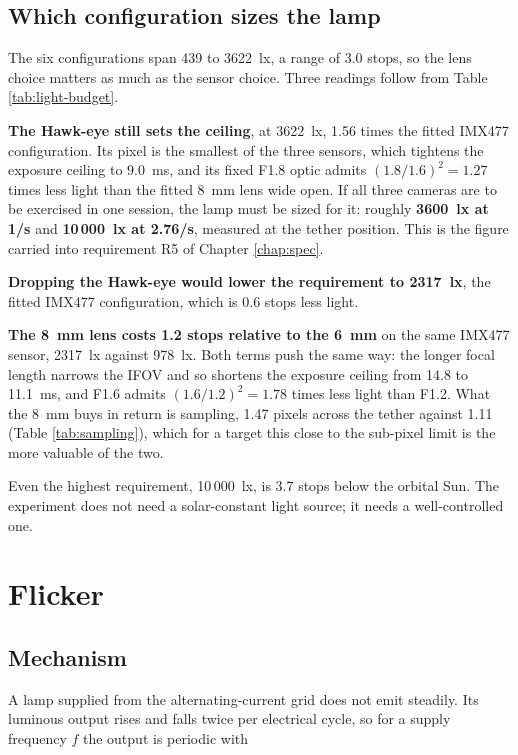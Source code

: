 \subsection{Which configuration sizes the lamp}

The six configurations span 439 to 3622~lx, a range of 3.0 stops, so the lens choice matters as much as the sensor choice. Three readings follow from Table \ref{tab:light-budget}.

\textbf{The Hawk-eye still sets the ceiling}, at 3622~lx, 1.56 times the fitted IMX477 configuration. Its pixel is the smallest of the three sensors, which tightens the exposure ceiling to 9.0~ms, and its fixed F1.8 optic admits $(1.8/1.6)^2 = 1.27$ times less light than the fitted 8~mm lens wide open. If all three cameras are to be exercised in one session, the lamp must be sized for it: roughly \textbf{3600~lx at 1\textdegree/s} and \textbf{10\,000~lx at 2.76\textdegree/s}, measured at the tether position. This is the figure carried into requirement R5 of Chapter \ref{chap:spec}.

\textbf{Dropping the Hawk-eye would lower the requirement to 2317~lx}, the fitted IMX477 configuration, which is 0.6 stops less light.

\textbf{The 8~mm lens costs 1.2 stops relative to the 6~mm} on the same IMX477 sensor, 2317~lx against 978~lx. Both terms push the same way: the longer focal length narrows the IFOV and so shortens the exposure ceiling from 14.8 to 11.1~ms, and F1.6 admits $(1.6/1.2)^2 = 1.78$ times less light than F1.2. What the 8~mm buys in return is sampling, 1.47 pixels across the tether against 1.11 (Table \ref{tab:sampling}), which for a target this close to the sub-pixel limit is the more valuable of the two.

Even the highest requirement, 10\,000~lx, is 3.7 stops below the orbital Sun. The experiment does not need a solar-constant light source; it needs a well-controlled one.

\section{Flicker}
\label{sec:flicker}

\subsection{Mechanism}

A lamp supplied from the alternating-current grid does not emit steadily. Its luminous output rises and falls twice per electrical cycle, so for a supply frequency $f$ the output is periodic with

